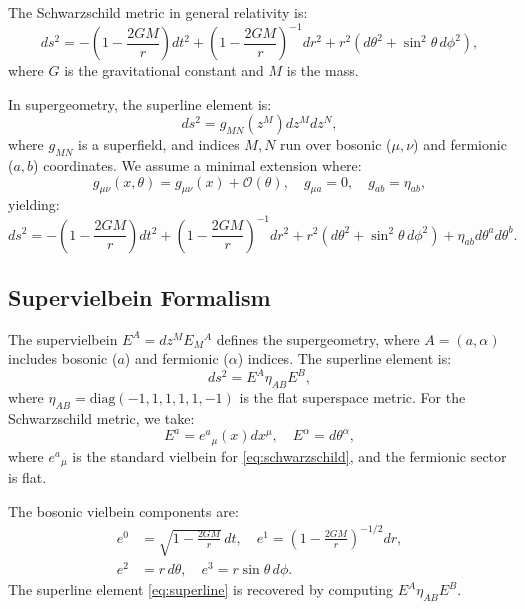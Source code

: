 \documentclass{article}
\theoremstyle{plain}
\newcommand{\supercoords}{z^{M}}
\newcommand{\superline}{ds^{2}}
\newcommand{\schwarzschild}{g_{\mu\nu}}
\newcommand{\supervielbein}{E^{A}}
\begin{document}
The Schwarzschild metric in general relativity is:
\begin{equation}
\superline = -\left(1 - \frac{2GM}{r}\right) dt^{2} + \left(1 - \frac{2GM}{r}\right)^{-1} dr^{2} + r^{2} (d\theta^{2} + \sin^{2}\theta \, d\phi^{2}),
\label{eq:schwarzschild}
\end{equation}
where $G$ is the gravitational constant and $M$ is the mass.

In supergeometry, the superline element is:
\begin{equation}
\superline = g_{MN}(\supercoords) dz^{M} dz^{N},
\end{equation}
where $g_{MN}$ is a superfield, and indices $M, N$ run over bosonic ($\mu, \nu$) and fermionic ($a, b$) coordinates. We assume a minimal extension where:
\begin{equation}
g_{\mu\nu}(x, \theta) = \schwarzschild(x) + \mathcal{O}(\theta), \quad g_{\mu a} = 0, \quad g_{ab} = \eta_{ab},
\end{equation}
yielding:
\begin{equation}
\superline = -\left(1 - \frac{2GM}{r}\right) dt^{2} + \left(1 - \frac{2GM}{r}\right)^{-1} dr^{2} + r^{2} (d\theta^{2} + \sin^{2}\theta \, d\phi^{2}) + \eta_{ab} d\theta^{a} d\theta^{b}.
\label{eq:superline}
\end{equation}

\subsection{Supervielbein Formalism}

The supervielbein $\supervielbein = dz^{M} E_{M}{}^{A}$ defines the supergeometry, where $A = (a, \alpha)$ includes bosonic ($a$) and fermionic ($\alpha$) indices. The superline element is:
\begin{equation}
\superline = \supervielbein \eta_{AB} E^{B},
\end{equation}
where $\eta_{AB} = \mathrm{diag}(-1, 1, 1, 1, 1, -1)$ is the flat superspace metric. For the Schwarzschild metric, we take:
\begin{equation}
E^{a} = e^{a}{}_{\mu}(x) dx^{\mu}, \quad E^{\alpha} = d\theta^{\alpha},
\end{equation}
where $e^{a}{}_{\mu}$ is the standard vielbein for \eqref{eq:schwarzschild}, and the fermionic sector is flat.

The bosonic vielbein components are:
\begin{align}
e^{0} &= \sqrt{1 - \frac{2GM}{r}} \, dt, \quad e^{1} = \left(1 - \frac{2GM}{r}\right)^{-1/2} dr, \\
e^{2} &= r \, d\theta, \quad e^{3} = r \sin\theta \, d\phi.
\end{align}
The superline element \eqref{eq:superline} is recovered by computing $\supervielbein \eta_{AB} E^{B}$.
\end{document}
